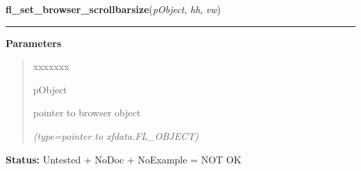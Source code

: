     \label{xformslib:library:fl_set_browser_scrollbarsize}

    \vspace{0.5ex}

\hspace{.8\funcindent}\begin{boxedminipage}{\funcwidth}

    \raggedright \textbf{fl\_set\_browser\_scrollbarsize}(\textit{pObject}, \textit{hh}, \textit{vw})

    \vspace{-1.5ex}

    \rule{\textwidth}{0.5\fboxrule}
\setlength{\parskip}{2ex}
\setlength{\parskip}{1ex}
      \textbf{Parameters}
      \vspace{-1ex}

      \begin{quote}
        \begin{Ventry}{xxxxxxx}

          \item[pObject]

          pointer to browser object

            {\it (type=pointer to xfdata.FL\_OBJECT)}

        \end{Ventry}

      \end{quote}

\textbf{Status:} Untested + NoDoc + NoExample = NOT OK



    \end{boxedminipage}

    \label{xformslib:library:fl_show_browser_line}

    \vspace{0.5ex}

